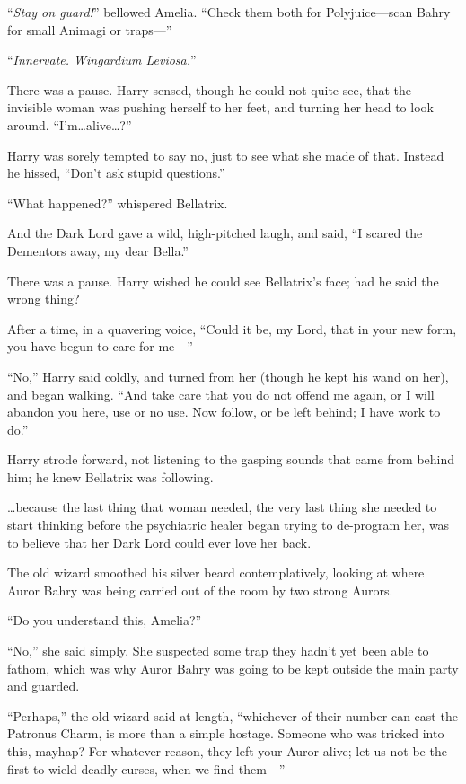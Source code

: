 “\emph{Stay on guard!}” bellowed Amelia.
“Check them both for Polyjuice—scan Bahry for small Animagi or traps—”

\later

“\emph{Innervate. Wingardium Leviosa.}”

There was a pause. Harry sensed, though he could not quite see, that the invisible woman was pushing herself to her feet, and turning her head to look around.
“I’m…alive…?”

Harry was sorely tempted to say no, just to see what she made of that. Instead he hissed,
“Don’t ask stupid questions.”

“What happened?” whispered Bellatrix.

And the Dark Lord gave a wild, high-pitched laugh, and said,
“I scared the Dementors away, my dear Bella.”

There was a pause. Harry wished he could see Bellatrix’s face; had he said the wrong thing?

After a time, in a quavering voice,
“Could it be, my Lord, that in your new form, you have begun to care for me—”

“No,” Harry said coldly, and turned from her (though he kept his wand on her), and began walking.
“And take care that you do not offend me again, or I will abandon you here, use or no use. Now follow, or be left behind; I have work to do.”

Harry strode forward, not listening to the gasping sounds that came from behind him; he knew Bellatrix was following.

…because the last thing that woman needed, the very last thing she needed to start thinking before the psychiatric healer began trying to de-program her, was to believe that her Dark Lord could ever love her back.

\later

The old wizard smoothed his silver beard contemplatively, looking at where Auror Bahry was being carried out of the room by two strong Aurors.

“Do you understand this, Amelia?”

“No,” she said simply. She suspected some trap they hadn’t yet been able to fathom, which was why Auror Bahry was going to be kept outside the main party and guarded.

“Perhaps,” the old wizard said at length, “whichever of their number can cast the Patronus Charm, is more than a simple hostage. Someone who was tricked into this, mayhap? For whatever reason, they left your Auror alive; let us not be the first to wield deadly curses, when we find them—”

